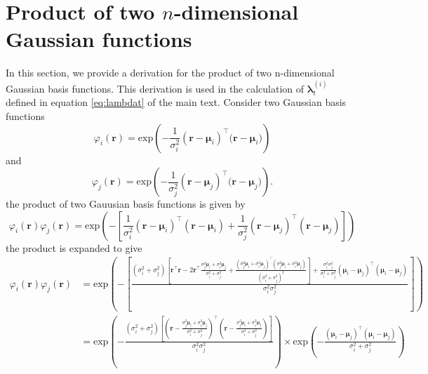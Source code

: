\documentclass[]{article}
\begin{document}
\ifpdf
{}
\else
{}
\fi

\renewcommand{\theequation}{S1.\arabic{equation}}




\section*{Product of two $n$-dimensional Gaussian functions}\label{sec:GaussianProduct} 
In this section, we provide a derivation for the product of two n-dimensional Gaussian basis functions.
This derivation is used in the  calculation of $\boldsymbol\lambda_t^{(i)}$  defined in equation \eqref{eq:lambdat} of the main text. Consider two
Gaussian basis functions
\begin{equation}\label{eq:n_dimensional_Gaussian1}
 \varphi_i(\mathbf r)=\mathrm{exp}\left({-\frac{1}{\sigma_i^2} (\mathbf r-\boldsymbol \mu_i)^\top(\mathbf r-\boldsymbol \mu_i})\right)
\end{equation}
and 
\begin{equation}\label{eq:n_dimensional_Gaussian2}
\varphi_j(\mathbf r)=\mathrm{exp}\left({-\frac{1}{\sigma_j^2} (\mathbf r-\boldsymbol \mu_j)^\top(\mathbf r-\boldsymbol \mu_j})\right).
\end{equation}
the product of two Gauusian basis functions is given by
\begin{equation}
 \varphi_i(\mathbf r)\varphi_j(\mathbf r)=\mathrm{exp}\left(-\left[ {\frac{1}{\sigma_i^2} (\mathbf r-\boldsymbol \mu_i)^\top(\mathbf r-\boldsymbol\mu_i)+{\frac{1}{\sigma_j^2} (\mathbf r-\boldsymbol \mu_j)^\top(\mathbf r-\boldsymbol\mu_j)}}\right] \right)
\end{equation}
the product is expanded to give
\begin{align} 
 \varphi_i(\mathbf r)\varphi_j(\mathbf r)&=\mathrm{exp}\left(-\left[ \frac{(\sigma_i^2+\sigma_j^2)\left[\mathbf r^\top\mathbf r-2\mathbf r^\top \frac{\sigma_j^2\boldsymbol\mu_i+\sigma_i^2\boldsymbol\mu_j}{\sigma_i^2+\sigma_j^2}+\frac{(\sigma_j^2\boldsymbol\mu_i+\sigma_i^2\boldsymbol\mu_j)^\top(\sigma_j^2\boldsymbol\mu_i+\sigma_i^2\boldsymbol\mu_j)}{(\sigma_i^2+\sigma_j^2)^2}   \right]  +\frac{\sigma_i^2\sigma_j^2}{\sigma_i^2+\sigma_j^2}(\boldsymbol \mu_i-\boldsymbol\mu_j)^\top(\boldsymbol \mu_i-\boldsymbol\mu_j) }{\sigma_i^2\sigma_j^2}\right] \right) \nonumber\\
&=\mathrm{exp}\left(-\frac{(\sigma_i^2+\sigma_j^2)\left[(\mathbf r-\frac{\sigma_j^2\boldsymbol\mu_i+\sigma_i^2\boldsymbol\mu_j}{\sigma_i^2+\sigma_j^2})^\top(\mathbf r-\frac{\sigma_j^2\boldsymbol\mu_i+\sigma_i^2\boldsymbol\mu_j}{\sigma_i^2+\sigma_j^2})\right]  }{\sigma_i^2\sigma_j^2}\right)
\times\mathrm{exp}\left(-\frac{(\boldsymbol \mu_i-\boldsymbol\mu_j)^\top(\boldsymbol \mu_i-\boldsymbol\mu_j)}{\sigma_i^2+\sigma_j^2}\right)
\end{align}
\end{document}
